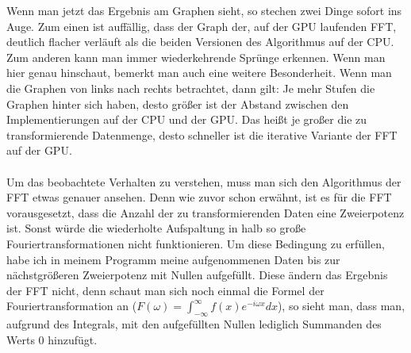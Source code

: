 \documentclass[a4paper,12pt]{article}
\theoremstyle{definition}
\theoremstyle{remark}
\begin{document}
Wenn man jetzt das Ergebnis am Graphen sieht, so stechen zwei Dinge sofort ins Auge. Zum einen ist auffällig, dass der Graph der, auf 
der GPU laufenden FFT, deutlich flacher verläuft als die beiden Versionen des Algorithmus auf der CPU. Zum anderen kann man immer wiederkehrende 
Sprünge erkennen. Wenn man hier genau hinschaut, bemerkt man auch eine weitere Besonderheit. Wenn man die Graphen von links nach rechts betrachtet, 
dann gilt: Je mehr Stufen die Graphen hinter sich haben, desto größer ist der Abstand zwischen den Implementierungen auf der CPU und der GPU. Das 
heißt je großer die zu transformierende Datenmenge, desto schneller ist die iterative Variante der FFT auf der GPU. 
\\\\
Um das beobachtete Verhalten zu verstehen, muss man sich den Algorithmus der FFT etwas genauer ansehen. Denn wie zuvor schon erwähnt, ist es 
für die FFT vorausgesetzt, dass die Anzahl der zu transformierenden Daten eine Zweierpotenz ist. Sonst würde die wiederholte Aufspaltung in halb so 
große Fouriertransformationen nicht funktionieren. Um diese Bedingung zu erfüllen, habe ich in meinem Programm meine aufgenommenen Daten bis zur 
nächstgrößeren Zweierpotenz mit Nullen aufgefüllt. Diese ändern das Ergebnis der FFT nicht, denn schaut man sich noch einmal die Formel der 
Fouriertransformation an ($F(\omega) = \int_{-\infty}^{\infty}{f(x) e^{-i\omega x} dx}$), so sieht man, dass man, aufgrund des Integrals, mit den 
aufgefüllten Nullen lediglich Summanden des Werts 0 hinzufügt. 
\end{document}

